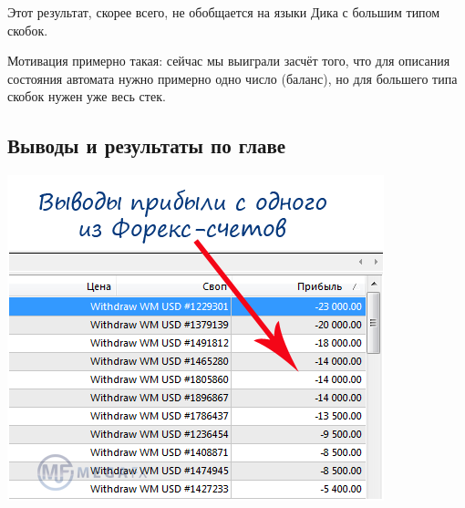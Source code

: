 \begin{note}
  Этот результат, скорее всего, не обобщается на языки Дика с большим типом скобок. 

  Мотивация примерно такая: сейчас мы выиграли засчёт того, что для описания состояния автомата нужно примерно одно число (баланс), но для большего типа скобок нужен уже весь стек.
\end{note}

\subsection{Выводы и результаты по главе}

\includegraphics[width=0.75\linewidth]{img/concl}

\TODO